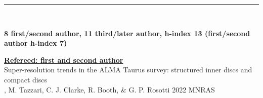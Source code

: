 \documentclass[10pt,preprint]{aastex}
\newcommand*{\xdash}[1][3em]{\rule[0.5ex]{#1}{0.7pt}}
\begin{document}


 \xdash[89.5ex] \\
\centerline{{\bf 8 first/second author, 11 third/later author, h-index 13 (first/second author h-index 7)}}

\noindent \underline{{\bf Refereed: first and second author}} \\
\noindent Super-resolution trends in the ALMA Taurus survey: structured inner discs and compact discs \\
, M. Tazzari, C. J. Clarke, R. Booth, \& G. P. Rosotti 2022 MNRAS 
\end{document}
